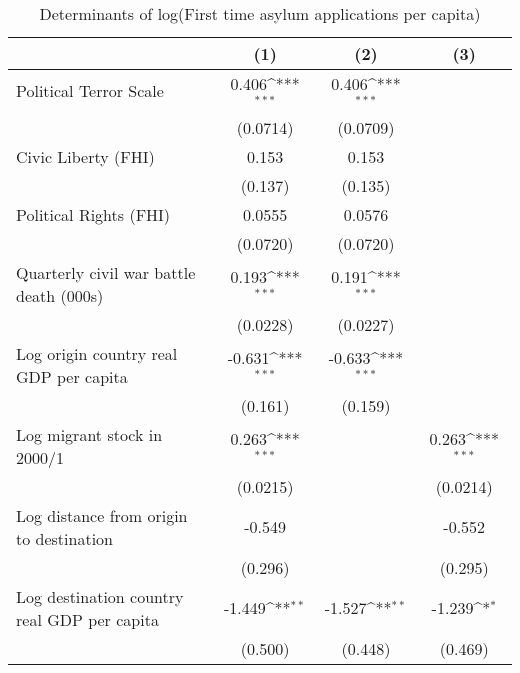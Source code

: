 \begin{table}[htbp]\centering
\def\sym#1{\ifmmode^{#1}\else\(^{#1}\)\fi}
\caption{Determinants of log(First time asylum applications per capita)}
\begin{tabular}{l*{3}{c}}
\hline\hline
                    &\multicolumn{1}{c}{(1)}         &\multicolumn{1}{c}{(2)}         &\multicolumn{1}{c}{(3)}         \\
\hline
Political Terror Scale&       0.406\sym{***}&       0.406\sym{***}&                     \\
                    &    (0.0714)         &    (0.0709)         &                     \\
[1em]
Civic Liberty (FHI) &       0.153         &       0.153         &                     \\
                    &     (0.137)         &     (0.135)         &                     \\
[1em]
Political Rights (FHI)&      0.0555         &      0.0576         &                     \\
                    &    (0.0720)         &    (0.0720)         &                     \\
[1em]
Quarterly civil war battle death (000s)&       0.193\sym{***}&       0.191\sym{***}&                     \\
                    &    (0.0228)         &    (0.0227)         &                     \\
[1em]
Log origin country real GDP per capita&      -0.631\sym{***}&      -0.633\sym{***}&                     \\
                    &     (0.161)         &     (0.159)         &                     \\
[1em]
Log migrant stock in 2000/1&       0.263\sym{***}&                     &       0.263\sym{***}\\
                    &    (0.0215)         &                     &    (0.0214)         \\
[1em]
Log distance from origin to destination&      -0.549         &                     &      -0.552         \\
                    &     (0.296)         &                     &     (0.295)         \\
[1em]
Log destination country real GDP per capita&      -1.449\sym{**} &      -1.527\sym{**} &      -1.239\sym{*}  \\
                    &     (0.500)         &     (0.448)         &     (0.469)         \\

\end{tabular}
\end{table}
